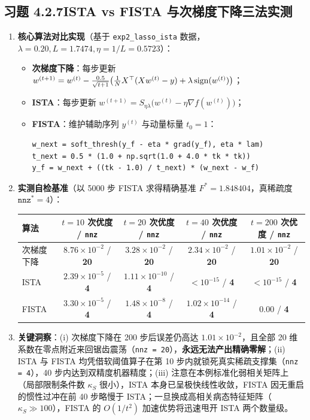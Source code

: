 \subsection*{习题 4.2.7\quad ISTA vs FISTA 与次梯度下降三法实测}
\begin{enumerate}[label=(\arabic*), leftmargin=1.8em]
  \item \textbf{核心算法对比实现}（基于 \texttt{exp2\_lasso\_ista} 数据，$\lambda = 0.20, L = 1.7474, \eta = 1/L = 0.5723$）：
  \begin{itemize}
    \item \textbf{次梯度下降}：每步更新 $w^{(t+1)} = w^{(t)} - \frac{0.5}{\sqrt{t+1}}\big(\frac{1}{N}X^\top(Xw^{(t)}-y) + \lambda\operatorname{sign}(w^{(t)})\big)$；
    \item \textbf{ISTA}：每步更新 $w^{(t+1)} = S_{\eta\lambda}\big(w^{(t)} - \eta\nabla f(w^{(t)})\big)$；
    \item \textbf{FISTA}：维护辅助序列 $y^{(t)}$ 与动量标量 $t_0 = 1$：
    \begin{lstlisting}
w_next = soft_thresh(y_f - eta * grad(y_f), eta * lam)
t_next = 0.5 * (1.0 + np.sqrt(1.0 + 4.0 * tk * tk))
y_f = w_next + ((tk - 1.0) / t_next) * (w_next - w_f)
    \end{lstlisting}
  \end{itemize}
  \item \textbf{实测自检基准}（以 5000 步 FISTA 求得精确基准 $F^* = 1.848404$，真稀疏度 $\texttt{nnz}^* = 4$）：
  \begin{center}\small
  \begin{tabular}{@{}lcccc@{}}
    \toprule
    \textbf{算法} & $t=10$ 次优度 / \texttt{nnz} & $t=20$ 次优度 / \texttt{nnz} & $t=40$ 次优度 / \texttt{nnz} & $t=200$ 次优度 / \texttt{nnz} \\
    \midrule
    次梯度下降 & $8.76\times 10^{-2}$ / \textbf{20} & $3.28\times 10^{-2}$ / \textbf{20} & $2.34\times 10^{-2}$ / \textbf{20} & $1.01\times 10^{-2}$ / \textbf{20} \\
    ISTA & $2.39\times 10^{-5}$ / \textbf{4} & $1.11\times 10^{-10}$ / \textbf{4} & $<10^{-15}$ / \textbf{4} & $<10^{-15}$ / \textbf{4} \\
    FISTA & $3.30\times 10^{-5}$ / \textbf{4} & $1.48\times 10^{-8}$ / \textbf{4} & $1.02\times 10^{-14}$ / \textbf{4} & $0.00$ / \textbf{4} \\
    \bottomrule
  \end{tabular}
  \end{center}
  \item \textbf{关键洞察}：(i) 次梯度下降在 200 步后误差仍高达 $1.01\times 10^{-2}$，且全部 20 维系数在零点附近来回锯齿震荡（\texttt{nnz = 20}），\textbf{永远无法产出精确零解}；(ii) ISTA 与 FISTA 均凭借软阈值算子在第 10 步内就锁死真实稀疏支撑集（\texttt{nnz = 4}），40 步内达到双精度机器精度；(iii) 注意在本例标准化弱相关矩阵上（局部限制条件数 $\kappa_S$ 很小），ISTA 本身已呈极快线性收敛，FISTA 因无重启的惯性过冲在前 40 步略慢于 ISTA；一旦换成高相关病态特征矩阵（$\kappa_S \gg 100$），FISTA 的 $O(1/t^2)$ 加速优势将迅速甩开 ISTA 两个数量级。
\end{enumerate}

